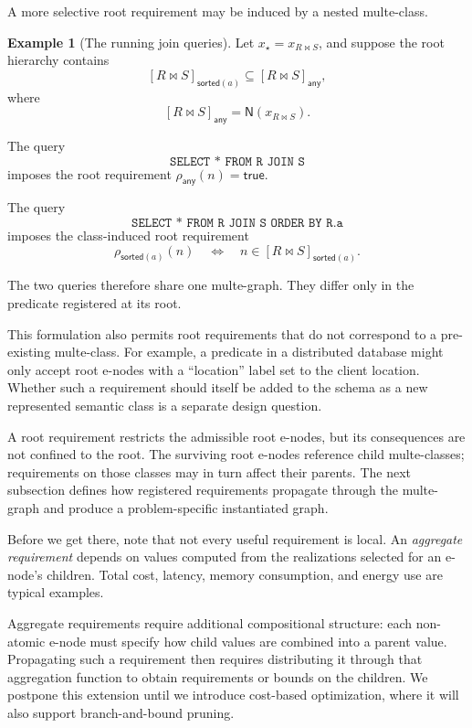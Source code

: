 \documentclass[sigconf,nonacm]{acmart}
\theoremstyle{definition}
\newtheorem{example}[definition]{Example}
\theoremstyle{plain}
\theoremstyle{remark}
\begin{document}
A more selective root requirement may be induced by a nested
multe-class.

\begin{example}[The running join queries]
Let \(x_\star=x_{R\Join S}\),
and suppose the root hierarchy contains
\[
[R\Join S]_{\mathsf{sorted}(a)}
\subseteq
[R\Join S]_{\mathsf{any}},
\]
where
\[
[R\Join S]_{\mathsf{any}}
=
\mathsf N(x_{R\Join S}).
\]

The query
\[
\texttt{SELECT * FROM R JOIN S}
\]
imposes the root requirement
\(\rho_{\mathsf{any}}(n)=\mathsf{true}\).

The query
\[
\texttt{SELECT * FROM R JOIN S ORDER BY R.a}
\]
imposes the class-induced root requirement
\[
\rho_{\mathsf{sorted}(a)}(n)
\quad\Longleftrightarrow\quad
n\in[R\Join S]_{\mathsf{sorted}(a)}.
\]

The two queries therefore share one multe-graph.
They differ only in the predicate registered at its root.
\end{example}

This formulation also permits root requirements that do not correspond
to a pre-existing multe-class.
For example, a predicate in a distributed database might only accept root e-nodes with a ``location'' label set to the client location.
Whether such a requirement should itself be added to the schema as a
new represented semantic class is a separate design question.

A root requirement restricts the admissible root e-nodes, but its
consequences are not confined to the root.
The surviving root e-nodes reference child multe-classes; requirements
on those classes may in turn affect their parents.
The next subsection defines how registered requirements propagate
through the multe-graph and produce a problem-specific instantiated
graph.

Before we get there, note that not every useful requirement is local.
An \emph{aggregate requirement} depends on values computed from the
realizations selected for an e-node's children.  Total cost, latency,
memory consumption, and energy use are typical examples.

Aggregate requirements require additional compositional structure:
each non-atomic e-node must specify how child values are combined into
a parent value.  Propagating such a requirement then requires
distributing it through that aggregation function to obtain
requirements or bounds on the children.  We postpone this extension
until we introduce cost-based optimization, where it will also support
branch-and-bound pruning.
\end{document}
